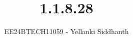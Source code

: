 \documentclass[journal]{IEEEtran}
\begin{document}
	
	
	\vspace{3cm}
	
	\title{1.1.8.28}
	\author{EE24BTECH11059 - Yellanki Siddhanth
	}
	{\let\newpage\relax\maketitle}
	
	\renewcommand{\thefigure}{\theenumi}
	\renewcommand{\thetable}{\theenumi}
	\setlength{\intextsep}{10pt} %
	
	
	\renewcommand{\thetable}{\theenumi}
	
\end{document}
